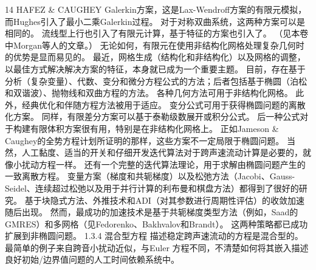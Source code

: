 \documentclass[UTF8,11pt,a4paper,openany,fontset=fandol]{ctexbook}
\begin{document}
14 HAFEZ \& CAUGHEY Galerkin方案，这是Lax-Wendroff方案的有限元模拟，而Hughes引入了最小二乘Galerkin过程。 对于对称双曲系统，这两种方案可以是相同的。 流线型上行也引入了有限元计算，基于特征的方案也引入了。 （见本卷中Morgan等人的文章。） 无论如何，有限元在使用非结构化网格处理复杂几何时的优势是显而易见的。 最近，网格生成（结构化和非结构化）以及网格的调整，以最佳方式解决解决方案的特征，本身就已成为一个重要主题。 目前，存在基于分析（复杂变量）、代数、变分和微分方程公式的方法；后者包括基于椭圆（泊松和双谐波）、抛物线和双曲方程的方法。 各种几何方法可用于非结构化网格。 此外，经典优化和伴随方程方法被用于适应。 变分公式可用于获得椭圆问题的离散化方案。 同样，有限差分方案可以基于泰勒级数展开或积分公式。 后一种公式对于构建有限体积方案很有用，特别是在非结构化网格上。 正如Jameson \& Caughey的全势方程计划所证明的那样，这些方案不一定局限于椭圆问题。 当然，人工黏度、适当的开关和仔细开发迭代算法对于跨声速流动计算是必要的，就像小扰动方程一样。 还有一个完整的迭代算法理论，用于求解由椭圆问题产生的一致离散方程。 变量方案（梯度和共轭梯度）以及松弛方法（Jacobi、Gauss-Seidel、连续超过松弛以及用于并行计算的利布曼和棋盘方法）都得到了很好的研究。 基于块隐式方法、外推技术和ADI（对其参数进行周期性评估）的收敛加速随后出现。 然而，最成功的加速技术是基于共轭梯度类型方法（例如，Saad的GMRES）和多网格（见Fedorenko、Bakhvalov和Brandt）。 这两种策略都已成功扩展到非椭圆问题。 1.3.4 混合型方程 描述稳定跨声速流动的方程是混合型的。 最简单的例子来自跨音小扰动近似，与Euler 方程不同，不清楚如何将其嵌入描述良好初始/边界值问题的人工时间依赖系统中。
\end{document}
